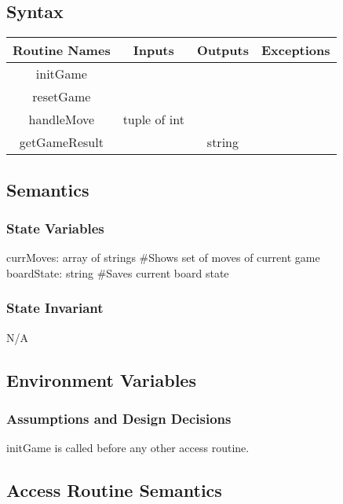 \documentclass{article}
\begin{document}
    \subsection*{Syntax}
        \begin{center}
            \begin{tabular}{|c|c|c|c|} 
                \hline
                Routine Names & Inputs & Outputs & Exceptions \\
                \hline
                initGame &  &  & \\ 
                \hline
                resetGame &  &  & \\ 
                \hline
                handleMove & tuple of int &  & \\ 
                \hline
                getGameResult & & string &  \\ 
                \hline
            \end{tabular}
        \end{center}
    
    \subsection*{Semantics}
        \subsubsection*{State Variables}
            currMoves: array of strings \#Shows set of moves of current game\\
            boardState: string \#Saves current board state
            
        \subsubsection*{State Invariant}
            N/A
            
    \subsection*{Environment Variables}
            
        \subsubsection*{Assumptions and Design Decisions}
            initGame is called before any other access routine.
            
    \subsection*{Access Routine Semantics}
    
\end{document}
